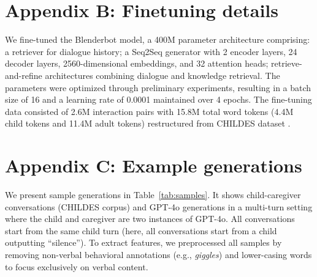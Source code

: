 \section*{Appendix B: Finetuning details}
We fine-tuned the Blenderbot model, a 400M parameter architecture comprising: a retriever for dialogue history; a Seq2Seq generator with 2 encoder layers, 24 decoder layers, 2560-dimensional embeddings, and 32 attention heads; retrieve-and-refine architectures combining dialogue and knowledge retrieval. The parameters were optimized through preliminary experiments, resulting in a batch size of 16 and a learning rate of 0.0001 maintained over 4 epochs. The fine-tuning data consisted of 2.6M interaction pairs with 15.8M total word tokens (4.4M child tokens and 11.4M adult tokens) restructured from CHILDES dataset \citep{macwhinney2000childes}.

\section*{Appendix C: Example generations}


We present sample generations in Table~\ref{tab:samples}. It shows child-caregiver conversations (CHILDES corpus) and GPT-4o generations in a multi-turn setting where the child and caregiver are two instances of GPT-4o. All conversations start from the same child turn (here, all conversations start from a child outputting ``silence''). To extract features, we preprocessed all samples by removing non-verbal behavioral annotations (e.g., \textit{giggles}) and lower-casing words to focus exclusively on verbal content. 

